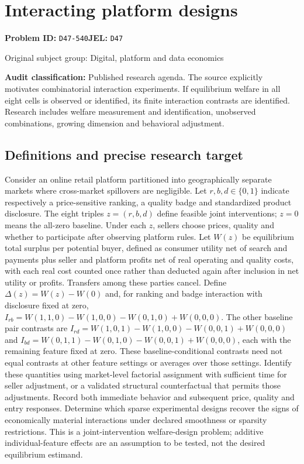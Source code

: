 \documentclass[11pt,a4paper]{article}
\begin{document}
\section*{Interacting platform designs}
\textbf{Problem ID:} \texttt{D47-540}\quad \textbf{JEL:} \texttt{D47}\par
\label{problem:OP-0401}
{\sffamily\small\color{muted}Original subject group: Digital, platform and data economics\par}
\label{definitions:problem:30007683}
\textbf{Audit classification:} Published research agenda. The source explicitly motivates combinatorial interaction experiments. If equilibrium welfare in all eight cells is observed or identified, its finite interaction contrasts are identified. Research includes welfare measurement and identification, unobserved combinations, growing dimension and behavioral adjustment.
\subsection*{Definitions and precise research target}
Consider an online retail platform partitioned into geographically separate markets where cross-market spillovers are negligible. Let \(r,b,d\in\{0,1\}\) indicate respectively a price-sensitive ranking, a quality badge and standardized product disclosure. The eight triples \(z=(r,b,d)\) define feasible joint interventions; \(z=0\) means the all-zero baseline. Under each \(z\), sellers choose prices, quality and whether to participate after observing platform rules. Let \(W(z)\) be equilibrium total surplus per potential buyer, defined as consumer utility net of search and payments plus seller and platform profits net of real operating and quality costs, with each real cost counted once rather than deducted again after inclusion in net utility or profits. Transfers among these parties cancel. Define \(\Delta(z)=W(z)-W(0)\) and, for ranking and badge interaction with disclosure fixed at zero, \(I_{rb}=W(1,1,0)-W(1,0,0)-W(0,1,0)+W(0,0,0)\). The other baseline pair contrasts are \(I_{rd}=W(1,0,1)-W(1,0,0)-W(0,0,1)+W(0,0,0)\) and \(I_{bd}=W(0,1,1)-W(0,1,0)-W(0,0,1)+W(0,0,0)\), each with the remaining feature fixed at zero. These baseline-conditional contrasts need not equal contrasts at other feature settings or averages over those settings. Identify these quantities using market-level factorial assignment with sufficient time for seller adjustment, or a validated structural counterfactual that permits those adjustments. Record both immediate behavior and subsequent price, quality and entry responses. Determine which sparse experimental designs recover the signs of economically material interactions under declared smoothness or sparsity restrictions. This is a joint-intervention welfare-design problem; additive individual-feature effects are an assumption to be tested, not the desired equilibrium estimand.
\end{document}
